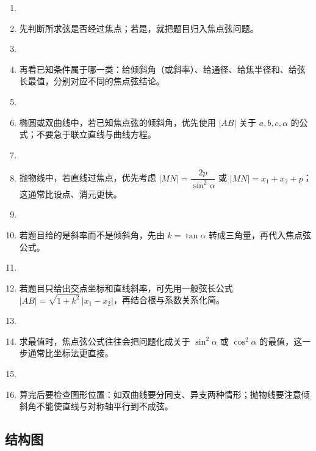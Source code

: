 \documentclass[UTF8,a4paper,11pt]{ctexart}
\begin{document}
\begin{enumerate}

\item \item 先判断所求弦是否经过焦点；若是，就把题目归入焦点弦问题。

\item \item 再看已知条件属于哪一类：给倾斜角（或斜率）、给通径、给焦半径和、给弦长最值，分别对应不同的焦点弦结论。

\item \item 椭圆或双曲线中，若已知焦点弦的倾斜角，优先使用 $|AB|$ 关于 $a,b,c,\alpha$ 的公式；不要急于联立直线与曲线方程。

\item \item 抛物线中，若直线过焦点，优先考虑 $|MN|=\dfrac{2p}{\sin^2\alpha}$ 或 $|MN|=x_1+x_2+p$；这通常比设点、消元更快。

\item \item 若题目给的是斜率而不是倾斜角，先由 $k=\tan\alpha$ 转成三角量，再代入焦点弦公式。

\item \item 若题目只给出交点坐标和直线斜率，可先用一般弦长公式 $|AB|=\sqrt{1+k^2}\,|x_1-x_2|$，再结合根与系数关系化简。

\item \item 求最值时，焦点弦公式往往会把问题化成关于 $\sin^2\alpha$ 或 $\cos^2\alpha$ 的最值，这一步通常比坐标法更直接。

\item \item 算完后要检查图形位置：如双曲线要分同支、异支两种情形；抛物线要注意倾斜角不能使直线与对称轴平行到不成弦。

\end{enumerate}

\subsection*{结构图}
\end{document}
